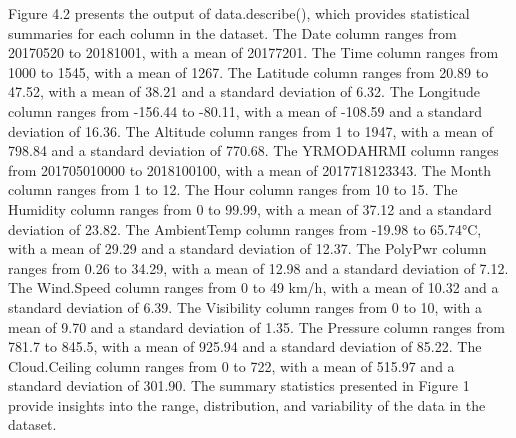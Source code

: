 \documentclass{report}
\begin{document}
Figure 4.2 presents the output of data.describe(), which provides statistical summaries for each column in the dataset. The Date column ranges from 20170520 to 20181001, with a mean of 20177201. The Time column ranges from 1000 to 1545, with a mean of 1267. The Latitude column ranges from 20.89 to 47.52, with a mean of 38.21 and a standard deviation of 6.32. The Longitude column ranges from -156.44 to -80.11, with a mean of -108.59 and a standard deviation of 16.36. The Altitude column ranges from 1 to 1947, with a mean of 798.84 and a standard deviation of 770.68. The YRMODAHRMI column ranges from 201705010000 to 2018100100, with a mean of 2017718123343. The Month column ranges from 1 to 12. The Hour column ranges from 10 to 15. The Humidity column ranges from 0 to 99.99, with a mean of 37.12 and a standard deviation of 23.82. The AmbientTemp column ranges from -19.98 to 65.74°C, with a mean of 29.29 and a standard deviation of 12.37. The PolyPwr column ranges from 0.26 to 34.29, with a mean of 12.98 and a standard deviation of 7.12. The Wind.Speed column ranges from 0 to 49 km/h, with a mean of 10.32 and a standard deviation of 6.39. The Visibility column ranges from 0 to 10, with a mean of 9.70 and a standard deviation of 1.35. The Pressure column ranges from 781.7 to 845.5, with a mean of 925.94 and a standard deviation of 85.22. The Cloud.Ceiling column ranges from 0 to 722, with a mean of 515.97 and a standard deviation of 301.90. The summary statistics presented in Figure 1 provide insights into the range, distribution, and variability of the data in the dataset.
\newpage
\end{document}
